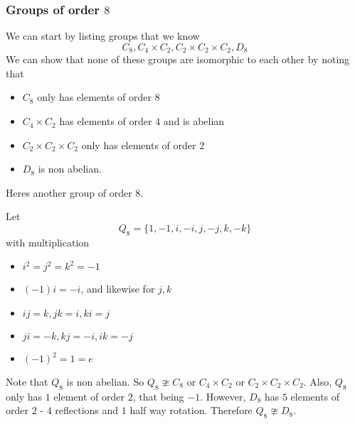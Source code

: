 \documentclass{article}
\begin{document}
\subsubsection*{Groups of order $8$}
We can start by listing groups that we know
\[
    C_8, C_4 \times C_2, C_2 \times C_2 \times C_2, D_8  
\]
We can show that none of these groups are isomorphic to each other by noting that
\begin{itemize}
    \item $C_8$ only has elements of order $8$
    \item $C_4 \times C_2$ has elements of order $4$ and is abelian
    \item $C_2 \times C_2 \times C_2$ only has elements of order $2$
    \item $D_8$ is non abelian.
\end{itemize}
Heres another group of order $8$.
\begin{defi}
    Let
    \[
        Q_8 = \{1, -1, i, -i, j, -j, k, -k\}  
    \]
    with multiplication
    \begin{itemize}
        \item $i^2 = j^2 = k^2 = -1$
        \item $(-1)i = -i$, and likewise for $j, k$
        \item $ij = k, jk = i, ki = j$
        \item $ji = -k, kj = -i, ik = -j$
        \item $(-1)^2 = 1 = e$
    \end{itemize}
    Note that $Q_8$ is non abelian. So $Q_8 \ncong C_8 \text{ or } C_4 \times C_2 \text{ or } C_2 \times C_2 \times C_2$.
    Also, $Q_8$ only has $1$ element of order $2$, that being $-1$. However, $D_8$ has $5$ elements of order $2$ - $4$ reflections and $1$ half way rotation.
    Therefore $Q_8 \ncong D_8$.
\end{defi}
\end{document}
